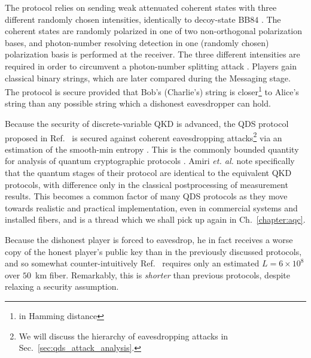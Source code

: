 The protocol relies on sending weak attenuated coherent states with three different randomly chosen intensities, identically to decoy-state BB$84$ \cite{Lo2005}. The coherent states are randomly polarized in one of two non-orthogonal polarization bases, and photon-number resolving detection in one (randomly chosen) polarization basis is performed at the receiver. The three different intensities are required in order to circumvent a photon-number splitting attack \cite{Brassard2000, Lutkenhaus2000}. Players gain classical binary strings, which are later compared during the Messaging stage. The protocol is secure provided that Bob's (Charlie's) string is closer\footnote{in Hamming distance} to Alice's string than any possible string which a dishonest eavesdropper can hold. 

Because the security of discrete-variable QKD is advanced, the QDS protocol proposed in Ref.~\cite{Amiri2016} is secured against coherent eavesdropping attacks\footnote{We will discuss the hierarchy of eavesdropping attacks in Sec.~\ref{sec:qds_attack_analysis}.} via an estimation of the smooth-min entropy \cite{Konig2009, Tomamichel2016}. This is the commonly bounded quantity for analysis of quantum cryptographic protocols \cite{Tomamichel2012a, Renner2005a}. Amiri \emph{et. al.} note specifically that the quantum stages of their protocol are identical to the equivalent QKD protocols, with difference only in the classical postprocessing of measurement results. This becomes a common factor of many QDS protocols as they move towards realistic and practical implementation, even in commercial systems and installed fibers, and is a thread which we shall pick up again in Ch.~\ref{chapter:aqc}.

Because the dishonest player is forced to eavesdrop, he in fact receives a worse copy of the honest player's public key than in the previously discussed protocols, and so somewhat counter-intuitively Ref.~\cite{Amiri2016} requires only an estimated $L = 6\times 10^8$ over $50$~km fiber. Remarkably, this is \emph{shorter} than previous protocols, despite relaxing a security assumption.


